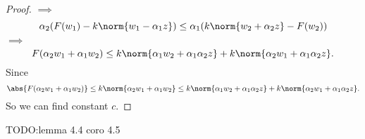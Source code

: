 \documentclass[a4paper]{book}
\DeclarePairedDelimiter{\norm}\lVert\rVert
\DeclarePairedDelimiter{\abs}\lvert\rvert
\begin{document}
\begin{proof}
    $\implies$
    \begin{equation*}
        \alpha_2(F(w_1) - k\norm{w_1-\alpha_1 z}) \leq \alpha_1(k\norm{w_2+\alpha_2 z} - F(w_2))
    \end{equation*}
    $\implies$
    \begin{equation}
        F(\alpha_2 w_1 + \alpha_1 w_2) \leq k\norm{\alpha_1 w_2 +\alpha_1 \alpha_2 z} +k\norm{\alpha_2 w_1 +\alpha_1 \alpha_2 z}.
    \end{equation}
    Since
    \begin{equation*}
        \abs{F(\alpha_2 w_1 + \alpha_1 w_2)} \leq k\norm{\alpha_2 w_1 + \alpha_1 w_2} \leq k\norm{\alpha_1 w_2 +\alpha_1 \alpha_2 z} +k\norm{\alpha_2 w_1 +\alpha_1 \alpha_2 z}.
    \end{equation*}
    So we can find constant $c$.
\end{proof}
TODO:lemma 4.4 coro 4.5
\end{document}
